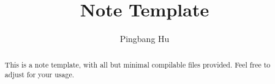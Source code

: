 \documentclass[a4paper]{report}
\author{Pingbang Hu}
\title{Note Template}
\begin{document}
\maketitle

\begin{abstract}
	This is a note template, with all but minimal compilable files provided. Feel free to adjust for your usage.
\end{abstract}

\newpage

\tableofcontents


\newpage
\appendix
\appendixpage



\newpage
\printbibliography
\end{document}
